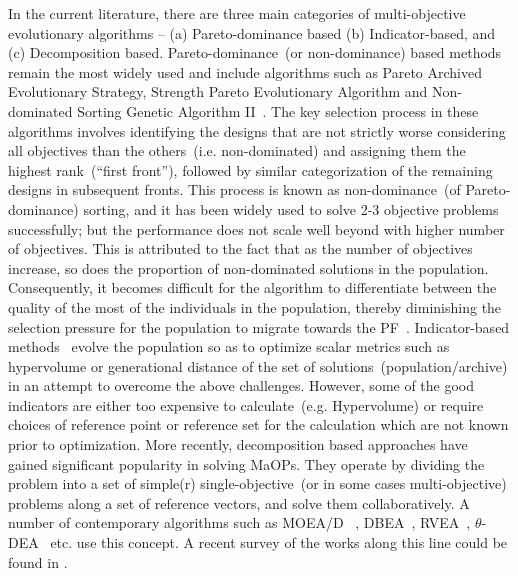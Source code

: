 \documentclass[twocolumn,10pt]{asme2ej}
\begin{document}
In the current literature, there are three main categories of multi-objective evolutionary algorithms -- (a) Pareto-dominance based (b) Indicator-based, and (c) Decomposition based.  Pareto-dominance~(or non-dominance) based methods remain the most widely used and include algorithms such as Pareto Archived Evolutionary Strategy, Strength Pareto Evolutionary Algorithm and Non-dominated Sorting Genetic Algorithm II~\cite{deb2001multi}. {\color{blue}The key selection process in these algorithms involves identifying the designs that are not strictly worse considering all objectives than the others~(i.e. non-dominated) and assigning them the highest rank~(``first front''), followed by similar categorization of the remaining designs in subsequent fronts. This process is known as non-dominance~(of Pareto-dominance) sorting, and it has been widely used to solve 2-3 objective problems successfully; but the performance does not scale well beyond with higher number of objectives. This is attributed to the fact that as the number of objectives increase, so does the proportion of non-dominated solutions in the population. Consequently, it becomes difficult for the algorithm to differentiate between the quality of the most of the individuals in the population, thereby diminishing the selection pressure for the population to migrate towards the PF~\cite{KHTishibuchi2008evolutionary,KHTli2015many}}. Indicator-based methods~\cite{zitzler2004indicator} evolve the population so as to optimize scalar metrics such as hypervolume or generational distance of the set of solutions~(population/archive) in an attempt to overcome the above challenges. However, some of the good indicators are either too expensive to calculate~(e.g. Hypervolume) or require choices of reference point or reference set for the calculation which are not known prior to optimization. More recently, decomposition based approaches have gained significant popularity in solving MaOPs. They operate by dividing the problem into a set of simple(r) single-objective~(or in some cases multi-objective) problems along a set of reference vectors, and solve them collaboratively. A number of contemporary algorithms such as MOEA/D~ \cite{KHTzhang2007moead}, DBEA~\cite{Asafuddoula2015}, RVEA~\cite{KHTCheng2016many}, $\theta$-DEA~\cite{KHTYuan2016many} etc. use this concept. A recent survey of the works along this line could be found in \cite{KHTtrivedisurvey}. 
\end{document}

